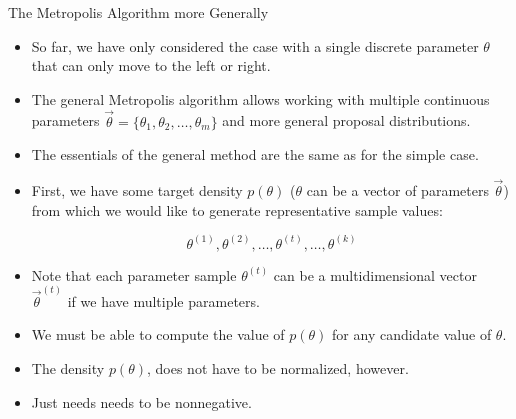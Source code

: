 \documentclass[handout]{beamer}
\begin{document}
\begin{frame}{The Metropolis Algorithm more Generally}
\scriptsize{

\begin{itemize}
\item So far, we have only considered the case with a single discrete parameter $\theta$ that can only move to the left or right.

\item The general Metropolis algorithm allows working with multiple continuous parameters $\vec{\theta}=\{\theta_1,\theta_2,\dots,\theta_m\}$ and more general proposal distributions.


\item The essentials of the general method are the same as for the simple case. 

\item First, we have some target density $p(\theta)$ ($\theta$ can be a vector of parameters $\vec{\theta}$) from which we would like to generate representative sample values:

\begin{displaymath}
\theta^{(1)},\theta^{(2)},\dots,\theta^{(t)}, \dots, \theta^{(k)}
\end{displaymath}

\item Note that each parameter sample $\theta^{(t)}$  can be a multidimensional vector $\vec{\theta}^{(t)}$ if we have multiple parameters.

\item We must be able to compute the value of $p(\theta)$ for any candidate value of $\theta$.
\item The density $p(\theta)$, does not have to be normalized, however.

\item Just needs needs to be nonnegative. 


\end{itemize}


} 
\end{frame}
\end{document}
